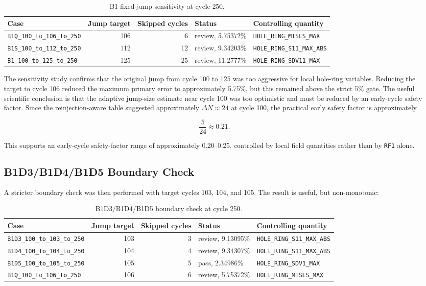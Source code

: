 \documentclass[11pt,a4paper]{article}
\newcommand{\code}[1]{\texttt{#1}}
\begin{document}
\begin{table}[H]
\centering
\caption{B1 fixed-jump sensitivity at cycle 250.}
\begin{tabular}{lrrll}
\toprule
Case & Jump target & Skipped cycles & Status & Controlling quantity \\
\midrule
\code{B1Q\_100\_to\_106\_to\_250} & 106 & 6 & review, 5.75372\% & \code{HOLE\_RING\_MISES\_MAX} \\
\code{B1S\_100\_to\_112\_to\_250} & 112 & 12 & review, 9.34203\% & \code{HOLE\_RING\_S11\_MAX\_ABS} \\
\code{B1\_100\_to\_125\_to\_250} & 125 & 25 & review, 11.2777\% & \code{HOLE\_RING\_SDV11\_MAX} \\
\bottomrule
\end{tabular}
\end{table}

The sensitivity study confirms that the original jump from cycle 100 to 125 was too aggressive for local hole-ring variables. Reducing the target to cycle 106 reduced the maximum primary error to approximately 5.75\%, but this remained above the strict 5\% gate. The useful scientific conclusion is that the adaptive jump-size estimate near cycle 100 was too optimistic and must be reduced by an early-cycle safety factor. Since the reinjection-aware table suggested approximately $\Delta N \approx 24$ at cycle 100, the practical early safety factor is approximately

\[
  \frac{5}{24} \approx 0.21 .
\]

This supports an early-cycle safety-factor range of approximately 0.20--0.25, controlled by local field quantities rather than by \code{RF1} alone.

\subsection{B1D3/B1D4/B1D5 Boundary Check}

A stricter boundary check was then performed with target cycles 103, 104, and 105. The result is useful, but non-monotonic:

\begin{table}[H]
\centering
\caption{B1D3/B1D4/B1D5 boundary check at cycle 250.}
\begin{tabular}{lrrll}
\toprule
Case & Jump target & Skipped cycles & Status & Controlling quantity \\
\midrule
\code{B1D3\_100\_to\_103\_to\_250} & 103 & 3 & review, 9.13095\% & \code{HOLE\_RING\_S11\_MAX\_ABS} \\
\code{B1D4\_100\_to\_104\_to\_250} & 104 & 4 & review, 9.34307\% & \code{HOLE\_RING\_S11\_MAX\_ABS} \\
\code{B1D5\_100\_to\_105\_to\_250} & 105 & 5 & pass, 2.34986\% & \code{HOLE\_RING\_SDV1\_MAX} \\
\code{B1Q\_100\_to\_106\_to\_250} & 106 & 6 & review, 5.75372\% & \code{HOLE\_RING\_MISES\_MAX} \\
\bottomrule
\end{tabular}
\end{table}
\end{document}
